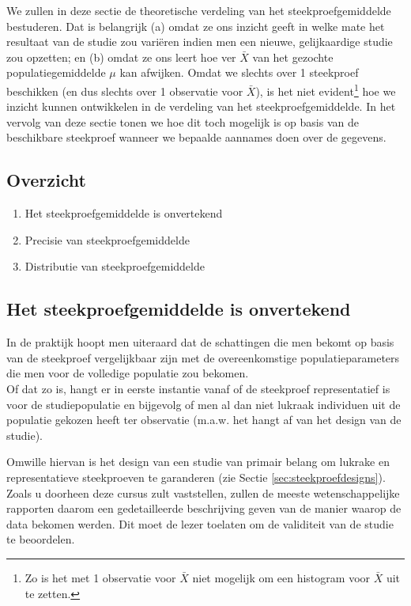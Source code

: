 \documentclass[
  12pt,dutch,coursenotes]{book}
\providecommand{\tightlist}{%
  \setlength{\itemsep}{0pt}\setlength{\parskip}{0pt}}
\begin{document}
We zullen in deze sectie de theoretische verdeling van het steekproefgemiddelde bestuderen.
Dat is belangrijk (a) omdat ze ons inzicht geeft in welke mate het resultaat van de studie zou variëren indien men een nieuwe, gelijkaardige studie zou opzetten; en (b) omdat ze ons leert hoe ver \(\bar X\) van het gezochte populatiegemiddelde \(\mu\) kan afwijken.
Omdat we slechts over 1 steekproef beschikken (en dus slechts over 1 observatie voor \(\bar X\)), is het niet evident\footnote{Zo is het met 1 observatie voor \(\bar X\) niet mogelijk om een histogram voor \(\bar X\) uit te zetten.} hoe we inzicht
kunnen ontwikkelen in de verdeling van het steekproefgemiddelde.
In het vervolg van deze sectie tonen we hoe dit toch mogelijk is op basis van de
beschikbare steekproef wanneer we bepaalde aannames doen over de gegevens.

\hypertarget{overzicht}{%
\subsection{Overzicht}\label{overzicht}}

\begin{enumerate}
\def\labelenumi{\arabic{enumi}.}
\tightlist
\item
  Het steekproefgemiddelde is onvertekend
\item
  Precisie van steekproefgemiddelde
\item
  Distributie van steekproefgemiddelde
\end{enumerate}

\hypertarget{het-steekproefgemiddelde-is-onvertekend}{%
\subsection{Het steekproefgemiddelde is onvertekend}\label{het-steekproefgemiddelde-is-onvertekend}}

In de praktijk hoopt men uiteraard dat de schattingen die men bekomt op basis van de steekproef vergelijkbaar zijn met de overeenkomstige populatieparameters die men voor de volledige populatie zou bekomen.\\
Of dat zo is, hangt er in eerste instantie vanaf of de steekproef representatief is voor de studiepopulatie en bijgevolg of men al dan niet lukraak individuen uit de populatie gekozen heeft ter observatie (m.a.w. het hangt af van het design van de studie).

Omwille hiervan is het design van een studie van primair belang om lukrake en representatieve steekproeven te garanderen (zie Sectie \ref{sec:steekproefdesigns}).
Zoals u doorheen deze cursus zult vaststellen, zullen de meeste wetenschappelijke rapporten daarom een gedetailleerde beschrijving geven van de manier waarop de data bekomen werden. Dit moet de lezer toelaten om de validiteit van de studie te beoordelen.
\end{document}

